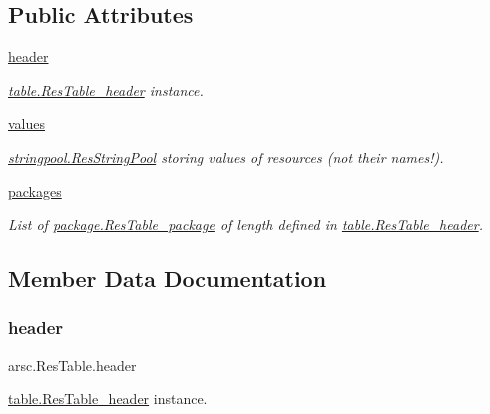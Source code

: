 \subsection*{Public Attributes}
\begin{DoxyCompactItemize}
\item 
\mbox{\hyperlink{classarsc_1_1ResTable_a04f14756cc2a3b1896fadca1f556f7d7}{header}}
\begin{DoxyCompactList}\small\item\em \mbox{\hyperlink{classtable_1_1ResTable__header}{table.\+Res\+Table\+\_\+header}} instance. \end{DoxyCompactList}\item 
\mbox{\hyperlink{classarsc_1_1ResTable_aa32fa0072c5535ef46837e8e659c6ab5}{values}}
\begin{DoxyCompactList}\small\item\em \mbox{\hyperlink{classstringpool_1_1ResStringPool}{stringpool.\+Res\+String\+Pool}} storing values of resources (not their names!). \end{DoxyCompactList}\item 
\mbox{\hyperlink{classarsc_1_1ResTable_a7446528982666902550f44c8037a3c5a}{packages}}
\begin{DoxyCompactList}\small\item\em List of \mbox{\hyperlink{classpackage_1_1ResTable__package}{package.\+Res\+Table\+\_\+package}} of length defined in \mbox{\hyperlink{classtable_1_1ResTable__header}{table.\+Res\+Table\+\_\+header}}. \end{DoxyCompactList}\end{DoxyCompactItemize}


\subsection{Member Data Documentation}
\mbox{\label{classarsc_1_1ResTable_a04f14756cc2a3b1896fadca1f556f7d7}} 
\subsubsection{\texorpdfstring{header}{header}}
{\footnotesize\ttfamily arsc.\+Res\+Table.\+header}



\mbox{\hyperlink{classtable_1_1ResTable__header}{table.\+Res\+Table\+\_\+header}} instance. 


